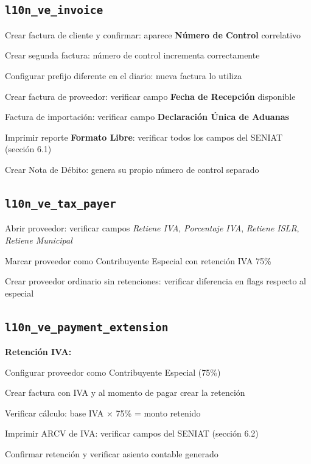 \documentclass[11pt,a4paper]{article}
\newcommand{\modulo}[1]{\texttt{\textcolor{naranja}{#1}}}
\begin{document}
\begin{Form}
\subsection{\modulo{l10n\_ve\_invoice}}

\begin{checklist}
  \item Crear factura de cliente y confirmar: aparece \textbf{Número de Control} correlativo
  \item Crear segunda factura: número de control incrementa correctamente
  \item Configurar prefijo diferente en el diario: nueva factura lo utiliza
  \item Crear factura de proveedor: verificar campo \textbf{Fecha de Recepción} disponible
  \item Factura de importación: verificar campo \textbf{Declaración Única de Aduanas}
  \item Imprimir reporte \textbf{Formato Libre}: verificar todos los campos del SENIAT (sección 6.1)
  \item Crear Nota de Débito: genera su propio número de control separado
\end{checklist}

\subsection{\modulo{l10n\_ve\_tax\_payer}}

\begin{checklist}
  \item Abrir proveedor: verificar campos \emph{Retiene IVA}, \emph{Porcentaje IVA}, \emph{Retiene ISLR}, \emph{Retiene Municipal}
  \item Marcar proveedor como Contribuyente Especial con retención IVA 75\%
  \item Crear proveedor ordinario sin retenciones: verificar diferencia en flags respecto al especial
\end{checklist}

\subsection{\modulo{l10n\_ve\_payment\_extension}}

\textbf{Retención IVA:}
\begin{checklist}
  \item Configurar proveedor como Contribuyente Especial (75\%)
  \item Crear factura con IVA y al momento de pagar crear la retención
  \item Verificar cálculo: base IVA $\times$ 75\% = monto retenido
  \item Imprimir ARCV de IVA: verificar campos del SENIAT (sección 6.2)
  \item Confirmar retención y verificar asiento contable generado
\end{checklist}


\end{Form}
\end{document}
